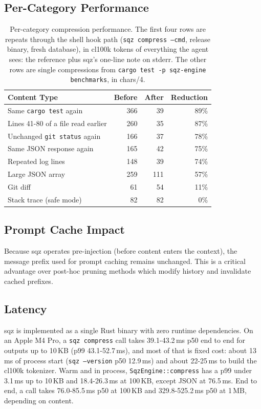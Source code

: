 \documentclass[10pt,twocolumn]{article}
\begin{document}
\subsection{Per-Category Performance}

\begin{table}[h]
\centering
\small
\begin{tabular}{@{}lrrr@{}}
\toprule
\textbf{Content Type} & \textbf{Before} & \textbf{After} & \textbf{Reduction} \\
\midrule
Same \texttt{cargo test} again & 366 & 39 & 89\% \\
Lines 41-80 of a file read earlier & 260 & 35 & 87\% \\
Unchanged \texttt{git status} again & 166 & 37 & 78\% \\
Same JSON response again & 165 & 42 & 75\% \\
Repeated log lines & 148 & 39 & 74\% \\
Large JSON array & 259 & 111 & 57\% \\
Git diff & 61 & 54 & 11\% \\
Stack trace (safe mode) & 82 & 82 & 0\% \\
\bottomrule
\end{tabular}
\caption{Per-category compression performance. The first four rows are repeats through the shell hook path (\texttt{sqz compress --cmd}, release binary, fresh database), in cl100k tokens of everything the agent sees: the reference plus sqz's one-line note on stderr. The other rows are single compressions from \texttt{cargo test -p sqz-engine benchmarks}, in chars/4.}
\label{tab:percategory}
\end{table}

\subsection{Prompt Cache Impact}

Because sqz operates pre-injection (before content enters the context), the message prefix used for prompt caching remains unchanged. This is a critical advantage over post-hoc pruning methods which modify history and invalidate cached prefixes.

\subsection{Latency}

sqz is implemented as a single Rust binary with zero runtime dependencies. On an Apple M4 Pro, a \texttt{sqz compress} call takes 39.1-43.2\,ms p50 end to end for outputs up to 10\,KB (p99 43.1-52.7\,ms), and most of that is fixed cost: about 13\,ms of process start (\texttt{sqz --version} p50 12.9\,ms) and about 22-25\,ms to build the cl100k tokenizer. Warm and in process, \texttt{SqzEngine::compress} has a p99 under 3.1\,ms up to 10\,KB and 18.4-26.3\,ms at 100\,KB, except JSON at 76.5\,ms. End to end, a call takes 76.0-85.5\,ms p50 at 100\,KB and 329.8-525.2\,ms p50 at 1\,MB, depending on content.
\end{document}
